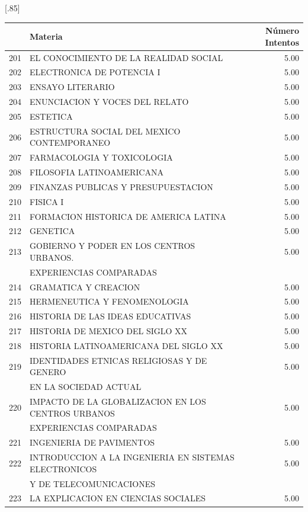 \documentclass[12pt]{article}
\begin{document}
\begin{table}[ht]
\centering
\scalebox{0.75}[.85]{
\begin{tabular}{rlr}
  \hline
 & Materia & N\'umero Intentos \\ 
  \hline
    201 & EL CONOCIMIENTO DE LA REALIDAD SOCIAL & 5.00 \\ 
  202 & ELECTRONICA DE POTENCIA I & 5.00 \\ 
  203 & ENSAYO LITERARIO & 5.00 \\ 
  204 & ENUNCIACION Y VOCES DEL RELATO & 5.00 \\ 
  205 & ESTETICA & 5.00 \\ 
  206 & ESTRUCTURA SOCIAL DEL MEXICO CONTEMPORANEO & 5.00 \\ 
  207 & FARMACOLOGIA Y TOXICOLOGIA & 5.00 \\ 
  208 & FILOSOFIA LATINOAMERICANA & 5.00 \\ 
  209 & FINANZAS PUBLICAS Y PRESUPUESTACION & 5.00 \\ 
  210 & FISICA I & 5.00 \\ 
  211 & FORMACION HISTORICA DE AMERICA LATINA & 5.00 \\ 
  212 & GENETICA & 5.00 \\ 
  213 & GOBIERNO Y PODER EN LOS CENTROS URBANOS.& 5.00 \\ 
 & EXPERIENCIAS COMPARADAS &  \\ 
  214 & GRAMATICA Y CREACION & 5.00 \\ 
  215 & HERMENEUTICA Y FENOMENOLOGIA & 5.00 \\ 
  216 & HISTORIA DE LAS IDEAS EDUCATIVAS & 5.00 \\ 
  217 & HISTORIA DE MEXICO DEL SIGLO XX & 5.00 \\ 
  218 & HISTORIA LATINOAMERICANA DEL SIGLO XX & 5.00 \\ 
  219 & IDENTIDADES ETNICAS RELIGIOSAS Y DE GENERO & 5.00 \\ 
   & EN LA SOCIEDAD ACTUAL &  \\ 
  220 & IMPACTO DE LA GLOBALIZACION EN LOS CENTROS URBANOS & 5.00 \\ 
 &  EXPERIENCIAS COMPARADAS &  \\ 
  221 & INGENIERIA DE PAVIMENTOS & 5.00 \\ 
  222 & INTRODUCCION A LA INGENIERIA EN SISTEMAS ELECTRONICOS & 5.00 \\ 
& Y DE TELECOMUNICACIONES & \\ 
  223 & LA EXPLICACION EN CIENCIAS SOCIALES & 5.00 \\ 

\end{tabular}}
\end{table}
\end{document}

